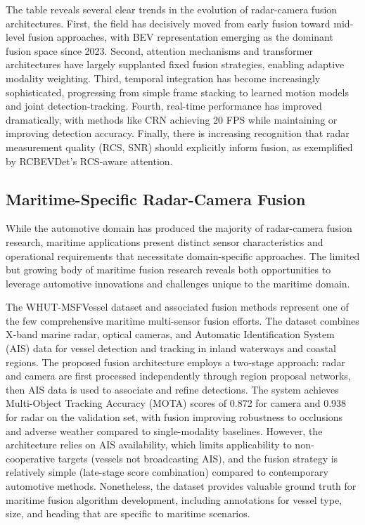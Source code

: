 The table reveals several clear trends in the evolution of radar-camera fusion architectures. First, the field has decisively moved from early fusion toward mid-level fusion approaches, with BEV representation emerging as the dominant fusion space since 2023. Second, attention mechanisms and transformer architectures have largely supplanted fixed fusion strategies, enabling adaptive modality weighting. Third, temporal integration has become increasingly sophisticated, progressing from simple frame stacking to learned motion models and joint detection-tracking. Fourth, real-time performance has improved dramatically, with methods like CRN achieving 20 FPS while maintaining or improving detection accuracy. Finally, there is increasing recognition that radar measurement quality (RCS, SNR) should explicitly inform fusion, as exemplified by RCBEVDet's RCS-aware attention.

\subsection{Maritime-Specific Radar-Camera Fusion}

While the automotive domain has produced the majority of radar-camera fusion research, maritime applications present distinct sensor characteristics and operational requirements that necessitate domain-specific approaches. The limited but growing body of maritime fusion research reveals both opportunities to leverage automotive innovations and challenges unique to the maritime domain.

The WHUT-MSFVessel dataset and associated fusion methods \cite{Yi2024WHUTMSFVessel} represent one of the few comprehensive maritime multi-sensor fusion efforts. The dataset combines X-band marine radar, optical cameras, and Automatic Identification System (AIS) data for vessel detection and tracking in inland waterways and coastal regions. The proposed fusion architecture employs a two-stage approach: radar and camera are first processed independently through region proposal networks, then AIS data is used to associate and refine detections. The system achieves Multi-Object Tracking Accuracy (MOTA) scores of 0.872 for camera and 0.938 for radar on the validation set, with fusion improving robustness to occlusions and adverse weather compared to single-modality baselines. However, the architecture relies on AIS availability, which limits applicability to non-cooperative targets (vessels not broadcasting AIS), and the fusion strategy is relatively simple (late-stage score combination) compared to contemporary automotive methods. Nonetheless, the dataset provides valuable ground truth for maritime fusion algorithm development, including annotations for vessel type, size, and heading that are specific to maritime scenarios.

